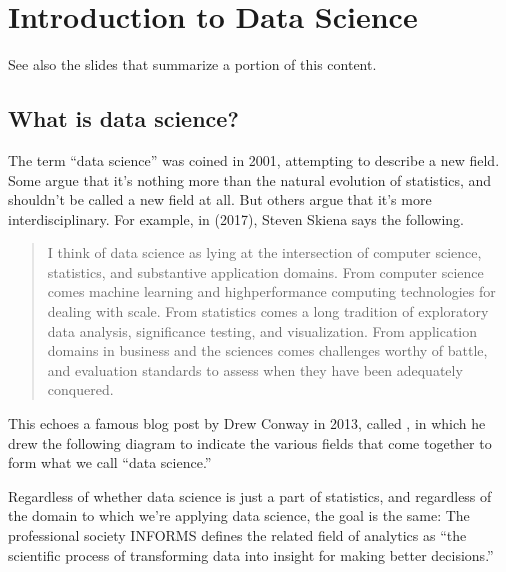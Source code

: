 \documentclass[letterpaper,10pt,english]{jupyterBook}
\begin{document}
\chapter{Introduction to Data Science}
\label{\detokenize{chapter-1-intro-to-data-science:introduction-to-data-science}}\label{\detokenize{chapter-1-intro-to-data-science::doc}}
\sphinxAtStartPar
See also the slides that summarize a portion of this content.


\section{What is data science?}
\label{\detokenize{chapter-1-intro-to-data-science:what-is-data-science}}
\sphinxAtStartPar
The term “data science” was coined in 2001, attempting to describe a new field.  Some argue that it’s nothing more than the natural evolution of statistics, and shouldn’t be called a new field at all.  But others argue that it’s more interdisciplinary.  For example, in  (2017), Steven Skiena says the following.
\begin{quote}

\sphinxAtStartPar
I think of data science as lying at the intersection of computer science, statistics, and substantive application domains. From computer science comes machine learning and high\sphinxhyphen{}performance computing technologies for dealing with scale. From statistics comes a long tradition of exploratory data analysis, significance testing, and visualization. From application domains in business and the sciences comes challenges worthy of battle, and evaluation standards to assess when they have been adequately conquered.
\end{quote}

\sphinxAtStartPar
This echoes a famous blog post by Drew Conway in 2013, called , in which he drew the following diagram to indicate the various fields that come together to form what we call “data science.”

\sphinxAtStartPar
{}

\sphinxAtStartPar
Regardless of whether data science is just a part of statistics, and regardless of the domain to which we’re applying data science, the goal is the same:   The professional society INFORMS defines the related field of analytics as “the scientific process of transforming data into insight for making better decisions.”
\end{document}
